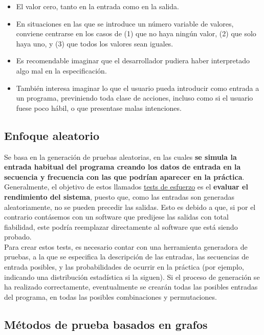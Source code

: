 \begin{itemize}
    \item El valor cero, tanto en la entrada como en la salida.
    \item En situaciones en las que se introduce un número variable de valores, conviene centrarse en los casos de (1) que no haya ningún valor, (2) que solo haya uno, y (3) que todos los valores sean iguales.
    \item Es recomendable imaginar que el desarrollador pudiera haber interpretado algo mal en la especificación.
    \item También interesa imaginar lo que el usuario pueda introducir como entrada a un programa, previniendo toda clase de acciones, incluso como si el usuario fuese poco hábil, o que presentase malas intenciones.
\end{itemize}

\subsection{Enfoque aleatorio}

Se basa en la generación de pruebas aleatorias, en las cuales \textbf{se simula la entrada habitual del programa creando los datos de entrada en la secuencia y frecuencia con las que podrían aparecer en la práctica}. Generalmente, el objetivo de estos llamados \uline{tests de esfuerzo} es el \textbf{evaluar el rendimiento del sistema}, puesto que, como las entradas son generadas aleatoriamente, no se pueden precedir las salidas. Esto es debido a que, si por el contrario contásemos con un software que predijese las salidas con total fiabilidad, este podría reemplazar directamente al software que está siendo probado.\\

Para crear estos tests, es necesario contar con una herramienta generadora de pruebas, a la que se especifica la descripción de las entradas, las secuencias de entrada posibles, y las probabilidades de ocurrir en la práctica (por ejemplo, indicando una distribución estadística si la siguen). Si el proceso de generación se ha realizado correctamente, eventualmente se crearán todas las posibles entradas del programa, en todas las posibles combinaciones y permutaciones. 

\subsection{Métodos de prueba basados en grafos}

